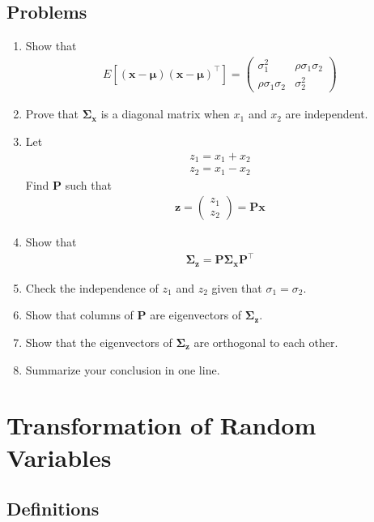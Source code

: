 \documentclass[journal,12pt,onecolumn]{IEEEtran}
\renewcommand\thesection{\arabic{section}}
\renewcommand\thesubsection{\thesection.\arabic{subsection}}
\providecommand{\sbrak}[1]{\ensuremath{{}\left[#1\right]}}
\providecommand{\brak}[1]{\ensuremath{\left(#1\right)}}
\theoremstyle{remark}
\newcommand{\myvec}[1]{\ensuremath{\begin{pmatrix}#1\end{pmatrix}}}
\numberwithin{equation}{section}
\let\vec\mathbf
\begin{document}
\subsection{Problems}
\begin{enumerate}[label=\arabic*.,ref=\thesubsection.\theenumi]
\item Show that
\begin{align}
	E\sbrak{\brak{\vec{x}-\bm{\mu}}\brak{\vec{x}-\bm{\mu}}^{\top}} = \myvec{\sigma^2_{1}&\rho\sigma_{1}\sigma_{2}\\\rho\sigma_{1}\sigma_{2}&\sigma^2_{2}}
\end{align}
\item Prove that $\vec{\Sigma_{x}}$ is a diagonal matrix when $x_1$ and $x_2$ are independent.
\item Let
\begin{align}
z_1 = x_1+x_2 \\ 
z_2 = x_1-x_2 
\end{align}
		Find $\vec{P}$ such that
\begin{align}
	\vec{z} =\myvec{z_1\\ z_2}  = \vec{P}\vec{x}
\end{align}
\item Show that 
	\begin{align} 
\vec{\Sigma_{z}} = \vec{P} \vec{\Sigma_x} \vec{P}^{\top} 
\end{align} 
\item 
	 Check the independence of $z_1$ and $z_2$ given that $\sigma_{1} = \sigma_{2}$.
\item Show that columns of $\vec{P}$ are eigenvectors of $\vec{\Sigma_z}$.
\item Show that the eigenvectors of $\vec{\Sigma_z}$ are orthogonal to each other.
\item Summarize your conclusion in one line.
\end{enumerate}
%
\section{Transformation of Random Variables}
\subsection{Definitions}
\end{document}
